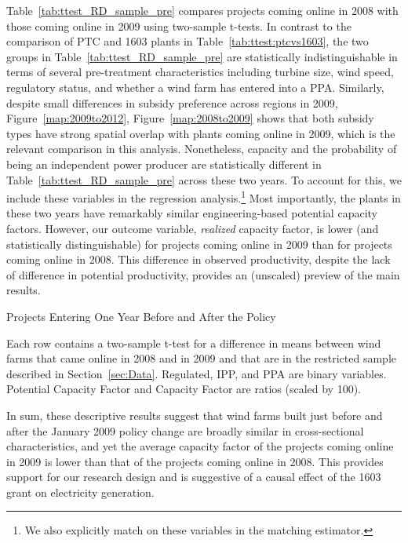 \documentclass[12pt]{article}
\begin{document}
Table~\ref{tab:ttest_RD_sample_pre} compares projects coming online in 2008 with those coming online in 2009 using two-sample t-tests. In contrast to the comparison of PTC and 1603 plants in Table~\ref{tab:ttest:ptcvs1603}, the two groups in Table~\ref{tab:ttest_RD_sample_pre} are statistically indistinguishable in terms of several pre-treatment characteristics including turbine size, wind speed, regulatory status, and whether a wind farm has entered into a PPA. Similarly, despite small differences in subsidy preference across regions in 2009, Figure~\ref{map:2009to2012}, Figure~\ref{map:2008to2009} shows that both subsidy types have strong spatial overlap with plants coming online in 2009, which is the relevant comparison in this analysis. Nonetheless, capacity and the probability of being an independent power producer are statistically different in Table~\ref{tab:ttest_RD_sample_pre} across these two years. To account for this, we include these variables in the regression analysis.\footnote{We also explicitly match on these variables in the matching estimator.} Most importantly, the plants in these two years have remarkably similar engineering-based potential capacity factors. However, our outcome variable, \textit{realized} capacity factor, is lower (and statistically distinguishable) for projects coming online in 2009 than for projects coming online in 2008. This difference in observed productivity, despite the lack of difference in potential productivity, provides an (unscaled) preview of the main results. 

\begin{table}[H]
\caption{Projects Entering One Year Before and After the Policy\label{tab:ttest_RD_sample_pre}}

\footnotesize

Each row contains a two-sample t-test for a difference in means between wind farms that came online in 2008 and in 2009 and that are in the restricted sample described in Section~\ref{sec:Data}. Regulated, IPP, and PPA are binary variables. Potential Capacity Factor and Capacity Factor are ratios (scaled by 100).
\end{table}

In sum, these descriptive results suggest that wind farms built just before and after the January 2009 policy change are broadly similar in cross-sectional characteristics, and yet the average capacity factor of the projects coming online in 2009 is lower than that of the projects coming online in 2008. This provides support for our research design and is suggestive of a causal effect of the 1603 grant on electricity generation.
\end{document}
